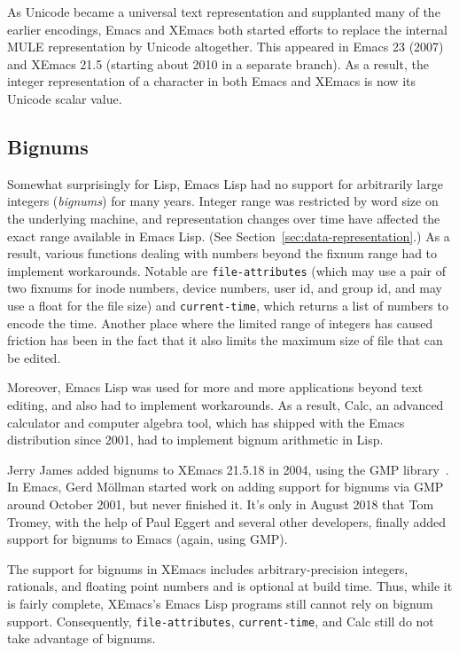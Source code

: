 \documentclass[format=acmsmall, review]{acmart}
\newcommand \Elisp {Emacs Lisp}
\begin{document}
As Unicode became a universal text representation and supplanted many
of the earlier encodings, Emacs and XEmacs both started efforts to
replace the internal MULE representation by Unicode altogether.  This
appeared in Emacs 23 (2007) and XEmacs 21.5 (starting about 2010 in a
separate branch).  As a result, the integer representation of a
character in both Emacs and XEmacs is now its Unicode scalar value.


\subsection{Bignums}

Somewhat surprisingly for Lisp, \Elisp{} had no support for
arbitrarily large integers (\emph{bignums}) for many years.
Integer range was restricted by word size on the underlying machine,
and representation changes over time have affected the exact range
available in \Elisp.  (See Section~\ref{sec:data-representation}.)
As a result, various functions dealing with numbers beyond the fixnum range
had to implement workarounds.  Notable are \texttt{file-attributes} (which
may use a pair of two fixnums for inode numbers, device numbers, user id,
and group id, and may use a float for the file size) and
\texttt{current-time}, which returns a list of numbers to encode the time.
Another place where the limited range of integers has caused friction has
been in the fact that it also limits the maximum size of file that can
be edited.

Moreover, \Elisp{} was used for more and more applications beyond
text editing, and also had to implement workarounds.  As a result,
Calc, an advanced calculator and computer algebra tool, which has
shipped with the Emacs distribution since 2001, had to implement
bignum arithmetic in Lisp.

Jerry James added bignums to XEmacs 21.5.18 in 2004, using the GMP
library~\cite{GMP}.  In Emacs, Gerd Möllman started work on adding support
for bignums via GMP around October 2001, but never finished it.  It's only
in August 2018 that Tom Tromey, with the help of Paul Eggert and several
other developers, finally added support for bignums to Emacs (again, using
GMP).

The support for bignums in XEmacs includes arbitrary-precision integers,
rationals, and floating point numbers and is optional at build time. Thus,
while it is fairly complete, XEmacs's \Elisp{} programs still cannot rely on
bignum support.  Consequently, \texttt{file-attributes},
\texttt{current-time}, and Calc still do not take advantage of bignums.
\end{document}
